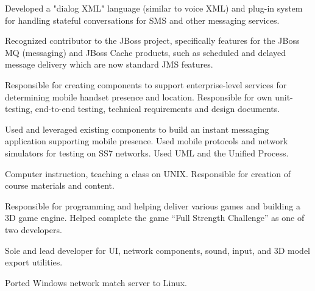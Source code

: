 \documentclass{article}
\begin{document}
Developed a "dialog XML" language (similar to voice XML) and plug-in
system for handling stateful conversations for SMS and other messaging services.

Recognized contributor to the JBoss project, specifically features for
the JBoss MQ (messaging) and JBoss Cache products, such as scheduled and
delayed message delivery which are now standard JMS features.

 

Responsible for creating components to support enterprise-level services
for determining mobile handset presence and location. Responsible for own
unit-testing, end-to-end testing, technical requirements and design
documents.

Used and leveraged existing components to build an instant messaging
application supporting mobile presence. Used mobile protocols and network
simulators for testing on SS7 networks.  Used UML and the Unified Process.


 
Computer instruction, teaching a class on UNIX. Responsible for creation
of course materials and content.

 
Responsible for programming and helping deliver various games and
building a 3D game engine.  Helped complete the game ``Full Strength
Challenge'' as one of two developers.

Sole and lead developer for UI, network components, sound, input,
and 3D model export utilities.

Ported Windows network match server to Linux.
\end{document}

